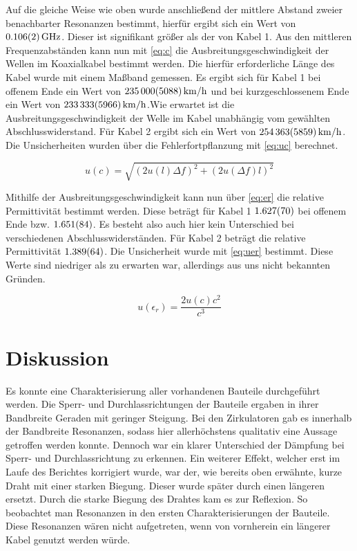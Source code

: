 Auf die gleiche Weise wie oben wurde anschließend der mittlere Abstand zweier benachbarter Resonanzen bestimmt, hierfür ergibt sich ein Wert von $\SI{0,106\pm0,002}{GHz}$. Dieser ist signifikant größer als der von Kabel 1. Aus den mittleren Frequenzabständen kann nun mit \cref{eq:c} die Ausbreitungsgeschwindigkeit der Wellen im Koaxialkabel bestimmt werden. Die hierfür erforderliche Länge des Kabel wurde mit einem Maßband gemessen. Es ergibt sich für Kabel 1 bei offenem Ende ein Wert von $\SI{235000\pm5088}{km/h}$ und bei kurzgeschlossenem Ende ein Wert von $\SI{233333\pm5966}{km/h}$.Wie erwartet ist die Ausbreitungsgeschwindigkeit der Welle im Kabel unabhängig vom gewählten Abschlusswiderstand. Für Kabel 2 ergibt sich ein Wert von $\SI{254363\pm5859}{km/h}$. Die Unsicherheiten wurden über die Fehlerfortpflanzung mit \cref{eq:uc} berechnet.

\begin{equation}
	u(c) = \sqrt{\left( 2u(l)\Delta f\right) ^2 +\left( 2u(\Delta f)l\right) ^2}
	\label{eq:uc}
\end{equation}

Mithilfe der Ausbreitungsgeschwindigkeit kann nun über \cref{eq:er} die relative Permittivität bestimmt werden. Diese beträgt für Kabel 1 $\SI{1,627\pm0,070}{}$ bei offenem Ende bzw. $\SI{1,651\pm0,084}{}$. Es besteht also auch hier kein Unterschied bei verschiedenen Abschlusswiderständen. Für Kabel 2 beträgt die relative Permittivität $\SI{1,389\pm0,064}{}$. Die Unsicherheit wurde mit \cref{eq:uer} bestimmt. Diese Werte sind niedriger als zu erwarten war, allerdings aus uns nicht bekannten Gründen. 

\begin{equation}
	u(\epsilon_r) = \frac{2u(c)c^2}{c^3}
	\label{eq:uer}
\end{equation}

\section{Diskussion}
Es konnte eine Charakterisierung aller vorhandenen Bauteile durchgeführt werden. Die Sperr- und Durchlassrichtungen der Bauteile ergaben in ihrer Bandbreite Geraden mit geringer Steigung. Bei den Zirkulatoren gab es innerhalb der Bandbreite Resonanzen, sodass hier allerhöchstens qualitativ eine Aussage getroffen werden konnte. Dennoch war ein klarer Unterschied der Dämpfung bei Sperr- und Durchlassrichtung zu erkennen. Ein weiterer Effekt, welcher erst im Laufe des Berichtes korrigiert wurde, war der, wie bereits oben erwähnte, kurze Draht mit einer starken Biegung. Dieser wurde später durch einen längeren ersetzt. Durch die starke Biegung des Drahtes kam es zur Reflexion. So beobachtet man Resonanzen in den ersten Charakterisierungen der Bauteile. Diese Resonanzen wären nicht aufgetreten, wenn von vornherein ein längerer Kabel genutzt werden würde. 

